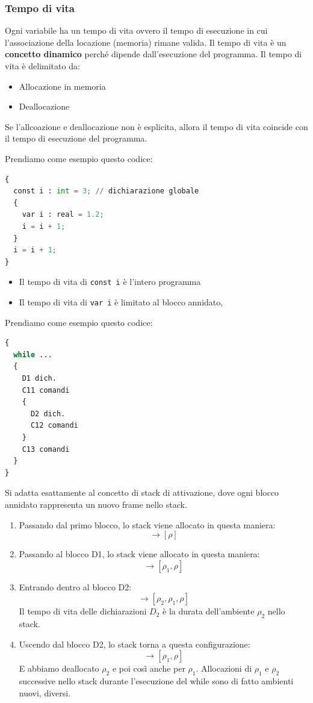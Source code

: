 \documentclass[a4paper]{article}
\begin{document}
\subsubsection{Tempo di vita}

Ogni variabile ha un tempo di vita ovvero il tempo di esecuzione 
in cui l'associazione della locazione (memoria) rimane valida. 
Il tempo di vita è un \textbf{concetto dinamico} perché dipende dall'esecuzione 
del programma. 
Il tempo di vita è delimitato da:
\begin{itemize}
  \item Allocazione in memoria 
  \item Deallocazione 
\end{itemize}
Se l'allcoazione e deallocazione non è esplicita, allora 
il tempo di vita coincide con il tempo di esecuzione del programma. 

\begin{Example}{}{}
  Prendiamo come esempio questo codice:
\begin{lstlisting}[language=Python]
{
  const i : int = 3; // dichiarazione globale
  {
    var i : real = 1.2; 
    i = i + 1; 
  }
  i = i + 1;
}
\end{lstlisting}
\begin{itemize}
  \item Il tempo di vita di \texttt{const i} è l'intero programma 
  \item Il tempo di vita di \texttt{var i} è limitato al blocco annidato,
\end{itemize}
\end{Example}
\begin{Example}{}{}
Prendiamo come esempio questo codice:
\begin{lstlisting}[language=Python]
{
  while ... 
  {
    D1 dich.
    C11 comandi 
    {
      D2 dich. 
      C12 comandi 
    }
    C13 comandi 
  }
}
\end{lstlisting}
\noindent
Si adatta esattamente al concetto di stack di attivazione,
dove ogni blocco annidato rappresenta un nuovo frame nello stack.
\begin{enumerate}
  \item Passando dal primo blocco, lo stack viene allocato in questa maniera:
  \[
    \rightarrow [\rho]
  \]
  \item Passando al blocco D1, lo stack viene allocato in questa maniera:
  \[
    \rightarrow [\rho_1, \rho]
  \]  
  \item Entrando dentro al blocco D2:
  \[
    \rightarrow [\rho_2, \rho_1, \rho]
  \]
  Il tempo di vita delle dichiarazioni $D_2$ è la durata dell'ambiente $\rho_2$ 
  nello stack. 
  \item Uscendo dal blocco D2, lo stack torna a questa configurazione:
  \[
    \rightarrow [\rho_1, \rho]
  \]
  E abbiamo deallocato $\rho_2$ e poi così anche per $\rho_1$. Allocazioni di 
  $\rho_1$ e $\rho_2$ successive nello stack durante 
  l'esecuzione del while sono di fatto ambienti nuovi, diversi. 
\end{enumerate}
\end{Example}
\end{document}
